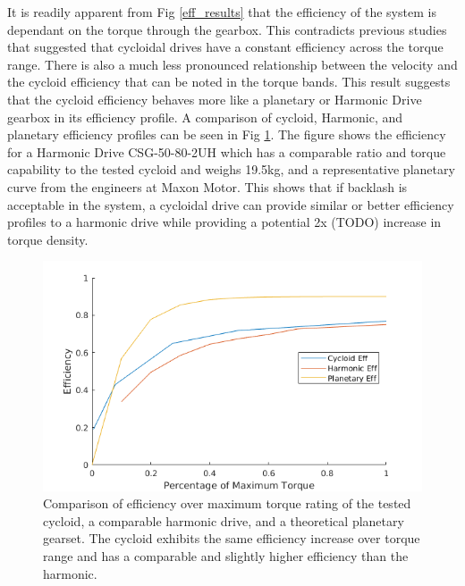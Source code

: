 It is readily apparent from Fig \ref{eff_results} that the efficiency of the system is dependant on the torque through the gearbox. This contradicts previous studies that suggested that cycloidal drives have a constant efficiency across the torque range. There is also a much less pronounced relationship between the velocity and the cycloid efficiency that can be noted in the torque bands. This result suggests that the cycloid efficiency behaves more like a planetary or Harmonic Drive gearbox in its efficiency profile. A comparison of cycloid, Harmonic, and planetary efficiency profiles can be seen in Fig \ref{eff_comp}. The figure shows the efficiency for a Harmonic Drive CSG-50-80-2UH \cite{harmonic_sheet} which has a comparable ratio and torque capability to the tested cycloid and weighs 19.5kg, and a representative planetary curve from the engineers at Maxon Motor. This shows that if backlash is acceptable in the system, a cycloidal drive can provide similar or better efficiency profiles to a harmonic drive while providing a potential 2x (TODO) increase in torque density.

   \begin{figure}[!b]
      \centering
      \includegraphics[width=\linewidth]{eff_comp_v2}
      \caption{Comparison of efficiency over maximum torque rating of the tested cycloid, a comparable harmonic drive, and a theoretical planetary gearset. The cycloid exhibits the same efficiency increase over torque range and has a comparable and slightly higher efficiency than the harmonic.}
      \label{eff_comp}
   \end{figure}
   
